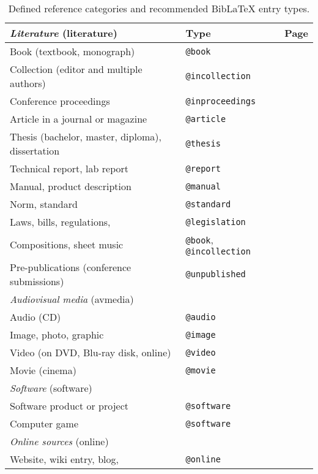 \begin{table}[htbp]
\caption{Defined reference categories and recommended BibLaTeX entry types.}
\label{tab:references-and-entry-types}
\centering
\begin{tabular}{@{}llc@{}}
	\toprule
	\emph{Literature} (\textsf{literature}) & Type & Page\\
	\midrule
	Book (textbook, monograph) & \texttt{@book} & \pageref{sec:@book}\\
	Collection (editor and multiple authors) & \texttt{@incollection} & \pageref{sec:@incollection} \\
	Conference proceedings & \texttt{@inproceedings} & \pageref{sec:@inproceedings}\\
	Article in a journal or magazine & \texttt{@article} & \pageref{sec:@article}\\
	Thesis (bachelor, master, diploma), dissertation & \texttt{@thesis} & \pageref{sec:@thesis}\\
	Technical report, lab report & \texttt{@report} & \pageref{sec:@report}\\
	Manual, product description & \texttt{@manual} & \pageref{sec:@manual}\\
	Norm, standard & \texttt{@standard} & \pageref{sec:@standard}\\
	Laws, bills, regulations, \etc & \texttt{@legislation} & \pageref{sec:@legislation}\\
	Compositions, sheet music & \texttt{@book}, \texttt{@incollection} & \pageref{sec:sheet-music}\\
	Pre-publications (\eg conference submissions) & \texttt{@unpublished} & \pageref{sec:@unpublished}\\
	\addlinespace
%
	\midrule
	\emph{Audiovisual media} (\textsf{avmedia}) & & \\
	\midrule
	Audio (CD) & \texttt{@audio} & \pageref{sec:@audio}\\
	Image, photo, graphic & \texttt{@image} & \pageref{sec:@image}\\
	Video (on DVD, Blu-ray disk, online) & \texttt{@video} & \pageref{sec:@video}\\
	Movie (cinema) & \texttt{@movie} & \pageref{sec:@movie}\\
	\addlinespace
%
	\midrule
	\emph{Software} (\textsf{software}) & & \\
	\midrule
	Software product or project & \texttt{@software} & \pageref{sec:@software}\\
	Computer game & \texttt{@software} & \pageref{sec:@software}\\
	\addlinespace
%
	\midrule
	\emph{Online sources} (\textsf{online}) & & \\
	\midrule
	Website, wiki entry, blog, \etc & \texttt{@online} & \pageref{sec:@online-www} \\
	\bottomrule
\end{tabular}
\end{table}

